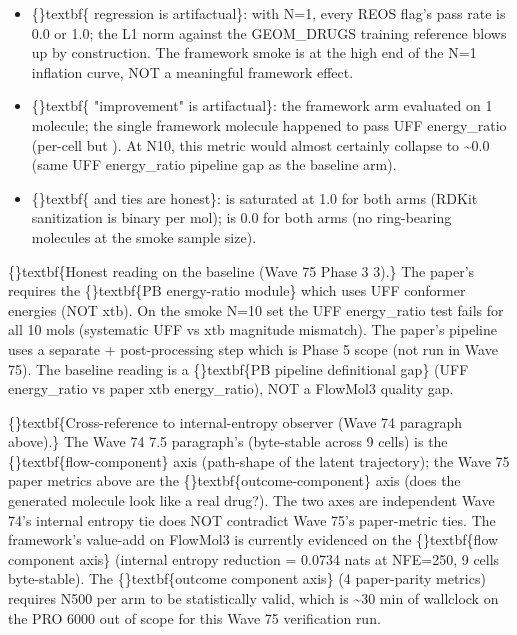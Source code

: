 \documentclass{article}
\begin{document}
\begin{itemize}
\item \{\}textbf\{ regression is artifactual\}: with N=1, every REOS flag's pass rate is 0.0 or 1.0; the L1 norm against the GEOM\_DRUGS training reference blows up by construction. The framework smoke  is at the high end of the N=1 inflation curve, NOT a meaningful framework effect.
\item \{\}textbf\{ "improvement" is artifactual\}: the framework arm evaluated on 1 molecule; the single framework molecule happened to pass UFF energy\_ratio (per-cell  but ). At N10, this metric would almost certainly collapse to \textasciitilde{}0.0 (same UFF energy\_ratio pipeline gap as the baseline arm).
\item \{\}textbf\{ and  ties are honest\}:  is saturated at 1.0 for both arms (RDKit sanitization is binary per mol);  is 0.0 for both arms (no ring-bearing molecules at the smoke sample size).
\end{itemize}
\{\}textbf\{Honest reading on the  baseline (Wave 75 Phase 3 3).\} The paper's  requires the \{\}textbf\{PB energy-ratio module\} which uses UFF conformer energies (NOT xtb). On the smoke N=10 set the UFF energy\_ratio test fails for all 10 mols (systematic UFF vs xtb magnitude mismatch). The paper's pipeline uses a separate  +  post-processing step which is Phase 5 scope (not run in Wave 75). The  baseline reading is a \{\}textbf\{PB pipeline definitional gap\} (UFF energy\_ratio vs paper xtb energy\_ratio), NOT a FlowMol3 quality gap.

\{\}textbf\{Cross-reference to internal-entropy observer (Wave 74 paragraph above).\} The Wave 74 7.5 paragraph's  (byte-stable across 9 cells) is the \{\}textbf\{flow-component\} axis (path-shape of the latent trajectory); the Wave 75 paper metrics above are the \{\}textbf\{outcome-component\} axis (does the generated molecule look like a real drug?). The two axes are independent  Wave 74's internal entropy tie does NOT contradict Wave 75's paper-metric ties. The framework's value-add on FlowMol3 is currently evidenced on the \{\}textbf\{flow component axis\} (internal entropy reduction = 0.0734 nats at NFE=250, 9 cells byte-stable). The \{\}textbf\{outcome component axis\} (4 paper-parity metrics) requires N500 per arm to be statistically valid, which is \textasciitilde{}30 min of wallclock on the PRO 6000  out of scope for this Wave 75 verification run.
\end{document}

